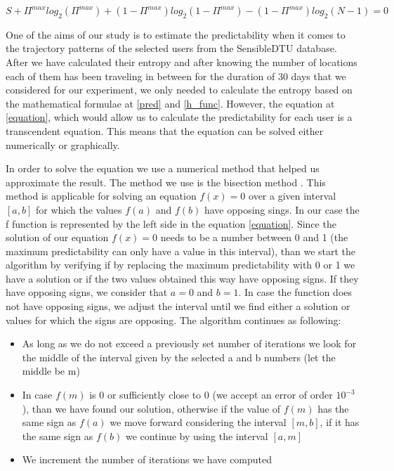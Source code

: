 \begin{equation}
\label{equation}
S + \Pi^{max}log_{2}(\Pi^{max}) + (1-\Pi^{max})log_{2}(1-\Pi^{max}) - (1 -
\Pi^{max})log_{2}(N-1) = 0
\end{equation}

One of the aims of our study is to estimate the predictability when it comes to
the trajectory patterns of the selected users from the SensibleDTU database.
After we have calculated their entropy and after knowing the number of locations
each of them has been traveling in between for the duration of $30$ days that we
considered for our experiment, we only needed to calculate the entropy based on
the mathematical formulae at \ref{pred} and \ref{h_func}. However, the equation
at \ref{equation}, which would allow us to calculate the predictability for each
user is a transcendent equation. This means that the equation can be solved
either numerically or graphically.

In order to solve the equation we use a numerical method that helped us
approximate the result. The method we use is the bisection method \cite{faires}.
This method is applicable for solving an equation $f(x) = 0$ over a given
interval $[a,b]$ for which the values $f(a)$ and $f(b)$ have opposing sings. In
our case the f function is represented by the left side in the equation
\ref{equation}. Since the solution of our equation $f(x) = 0$ needs to be a
number between 0 and 1 (the maximum predictability can only have a value in this
interval), than we start the algorithm by verifying if by replacing the maximum
predictability with 0 or 1 we have a solution or if the two values obtained this
way have opposing signs. If they have opposing signs, we consider that $a = 0$
and $b = 1$. In case the function does not have opposing signs, we adjust the
interval until we find either a solution or values for which the signs are
opposing. The algorithm continues as following:
\begin{itemize}
  \item As long as we do not exceed a previously set number of iterations we
  look for the middle of the interval given by the selected a and b numbers
  (let the middle be m)
  \item In case $f(m)$ is 0 or sufficiently close to 0 (we accept an error of
  order $10^{-3}$), than we have found our solution, otherwise if the value of
  $f(m)$ has the same sign as $f(a)$ we move forward considering the interval
  $[m,b]$, if it has the same sign as $f(b)$ we continue by using the interval
  $[a,m]$
  \item We increment the number of iterations we have computed
\end{itemize}

